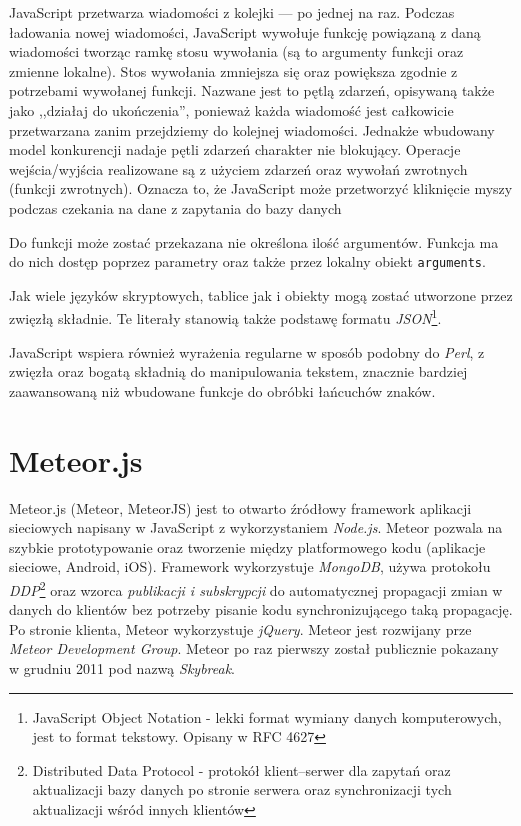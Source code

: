 JavaScript przetwarza wiadomości z kolejki --- po jednej na raz. Podczas ładowania nowej wiadomości, JavaScript wywołuje funkcję powiązaną z daną wiadomości tworząc ramkę stosu wywołania (są to argumenty funkcji oraz zmienne lokalne). Stos wywołania zmniejsza się oraz powiększa zgodnie z potrzebami wywołanej funkcji. Nazwane jest to pętlą zdarzeń, opisywaną także jako ,,działaj do ukończenia'', ponieważ każda wiadomość jest całkowicie przetwarzana zanim przejdziemy do kolejnej wiadomości. Jednakże wbudowany model konkurencji nadaje pętli zdarzeń charakter nie blokujący. Operacje wejścia/wyjścia realizowane są z użyciem zdarzeń oraz wywołań zwrotnych (funkcji zwrotnych). Oznacza to, że JavaScript może przetworzyć kliknięcie myszy podczas czekania na dane z zapytania do bazy danych\cite{jsWiki}

Do funkcji może zostać przekazana nie określona ilość argumentów. Funkcja ma do nich dostęp poprzez parametry oraz także przez lokalny obiekt \verb|arguments|\cite{jsWiki}.

Jak wiele języków skryptowych, tablice jak i obiekty mogą zostać utworzone przez zwięzłą składnie. Te literały stanowią także podstawę formatu \emph{JSON}\footnote{JavaScript Object Notation - lekki format wymiany danych komputerowych, jest to format tekstowy. Opisany w RFC 4627}\cite{jsWiki}.

JavaScript wspiera również wyrażenia regularne w sposób podobny do \emph{Perl}, z zwięzła oraz bogatą składnią do manipulowania tekstem, znacznie bardziej zaawansowaną niż wbudowane funkcje do obróbki łańcuchów znaków.

\section{Meteor.js}

Meteor.js (Meteor, MeteorJS) jest to otwarto źródłowy framework aplikacji sieciowych napisany w JavaScript z wykorzystaniem \emph{Node.js}. Meteor pozwala na szybkie prototypowanie oraz tworzenie między platformowego kodu (aplikacje sieciowe, Android, iOS). Framework wykorzystuje \emph{MongoDB}, używa protokołu \emph{DDP}\footnote{Distributed Data Protocol - protokół klient--serwer dla zapytań oraz aktualizacji bazy danych po stronie serwera oraz synchronizacji tych aktualizacji wśród innych klientów} oraz wzorca \emph{publikacji i subskrypcji} do automatycznej propagacji zmian w danych do klientów bez potrzeby pisanie kodu synchronizującego taką propagację. Po stronie klienta, Meteor wykorzystuje \emph{jQuery}. Meteor jest rozwijany prze \textit{Meteor Development Group}. Meteor po raz pierwszy został publicznie pokazany w grudniu 2011 pod nazwą \textit{Skybreak}\cite{meteorWiki}.

